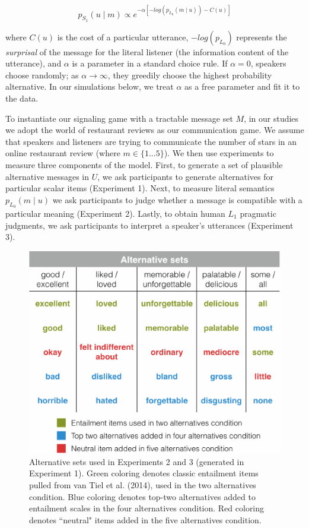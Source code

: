 \documentclass[10pt, letterpaper]{article}
\newenvironment{CodeChunk}{}{}
\begin{document}
\[p_{S_1}(u \mid m) \propto e^{-\alpha[-log(p_{L_0}(m \mid u)) - C(u)]} \tag{3}\]

\noindent where \(C(u)\) is the cost of a particular utterance,
\(-log(p_{L_0})\) represents the \emph{surprisal} of the message for the
literal listener (the information content of the utterance), and
\(\alpha\) is a parameter in a standard choice rule. If \(\alpha=0\),
speakers choose randomly; as \(\alpha \rightarrow \infty\), they
greedily choose the highest probability alternative. In our simulations
below, we treat \(\alpha\) as a free parameter and fit it to the data.

To instantiate our signaling game with a tractable message set \(M\), in
our studies we adopt the world of restaurant reviews as our
communication game. We assume that speakers and listeners are trying to
communicate the number of stars in an online restaurant review (where
\(m \in \{1...5\}\)). We then use experiments to measure three
components of the model. First, to generate a set of plausible
alternative messages in \(U\), we ask participants to generate
alternatives for particular scalar items (Experiment 1). Next, to
measure literal semantics \({p_{L_0} (m \mid u)}\) we ask participants
to judge whether a message is compatible with a particular meaning
(Experiment 2). Lastly, to obtain human \(L_1\) pragmatic judgments, we
ask participants to interpret a speaker's utterances (Experiment 3).

\begin{CodeChunk}
\begin{figure}[t]
\includegraphics{figs/allScalesTable-1} \caption[Alternative sets used in Experiments 2 and 3 (generated in Experiment 1)]{Alternative sets used in Experiments 2 and 3 (generated in Experiment 1). Green coloring denotes classic entailment items pulled from van Tiel et al. (2014), used in the two alternatives condition. Blue coloring denotes top-two alternatives added to entailment scales in the four alternatives condition. Red coloring denotes ``neutral" items added in the five alternatives condition.}\label{fig:allScalesTable}
\end{figure}
\end{CodeChunk}
\end{document}
